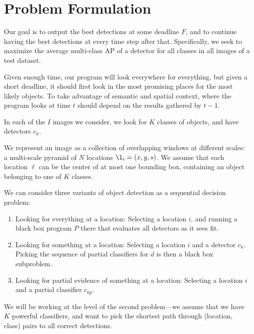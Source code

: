 \section{Problem Formulation}
Our goal is to output the best detections at some deadline $F$, and to continue having the best detections at every time step after that.
Specifically, we seek to maximize the average multi-class AP of a detector for all classes in all images of a test dataset.

Given enough time, our program will look everywhere for everything, but given a short deadline, it should first look in the most promising places for the most likely objects.
To take advantage of semantic and spatial context, where the program looks at time $t$ should depend on the results gathered by $t-1$.

In each of the $I$ images we consider, we look for $K$ classes of objects, and have detectors $c_k$.

We represent an image as a collection of overlapping windows at different scales: a multi-scale pyramid of $N$ locations $\l_i = (x,y,s)$.
We assume that each location $\ell$ can be the center of at most one bounding box, containing an object belonging to one of $K$ classes.

We can consider three variants of object detection as a sequential decision problem:
\begin{enumerate}
  \item Looking for everything at a location: Selecting a location $i$, and running a black box program $P$ there that evaluates all detectors as it sees fit.
  \item Looking for something at a location: Selecting a location $i$ and a detector $c_k$. Picking the sequence of partial classifiers for $d$ is then a black box subproblem.
\item Looking for partial evidence of something at a location: Selecting a location $i$ and a partial classifier $c_{kp}$.
\end{enumerate}
We will be working at the level of the second problem---we assume that we have $K$ powerful classifiers, and want to pick the shortest path through (location, class) pairs to all correct detections.

